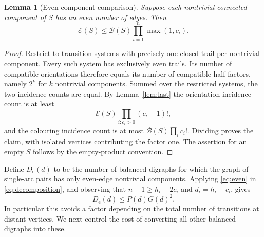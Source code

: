 \documentclass[11pt]{article}
\newtheorem{lemma}[theorem]{Lemma}
\theoremstyle{remark}\newtheorem{remark}[theorem]{Remark}
\newcommand{\De}{D_{\mathrm e}}
\newcommand{\EO}{\mathcal E}
\newcommand{\HF}{\mathcal B}
\begin{document}
\begin{lemma}[Even-component comparison]\label{lem:even}
Suppose each nontrivial connected component of $S$ has an even number of edges. Then
\begin{equation}\label{eq:even}
 \EO(S)\le \HF(S)\prod_{i=1}^n\max(1,c_i).
\end{equation}
\end{lemma}
\begin{proof}
Restrict to transition systems with precisely one closed trail per nontrivial component. Every such system has exclusively even trails. Its number of compatible orientations therefore equals its number of compatible half-factors, namely $2^k$ for $k$ nontrivial components. Summed over the restricted systems, the two incidence counts are equal. By Lemma~\ref{lem:last} the orientation incidence count is at least
\[\EO(S)\prod_{i:c_i>0}(c_i-1)!,\]
and the colouring incidence count is at most $\HF(S)\prod_i c_i!$. Dividing proves the claim, with isolated vertices contributing the factor one. The assertion for an empty $S$ follows by the empty-product convention.
\end{proof}

Define $\De(d)$ to be the number of balanced digraphs for which the graph of single-arc pairs has only even-edge nontrivial components. Applying \eqref{eq:even} in \eqref{eq:decomposition}, and observing that $n-1\ge h_i+2c_i$ and $d_i=h_i+c_i$, gives
\begin{equation}\label{eq:De}
 \De(d)\le P(d)G(d)^2.
\end{equation}
In particular this avoids a factor depending on the total number of transitions at distant vertices. We next control the cost of converting all other balanced digraphs into these.
\end{document}
